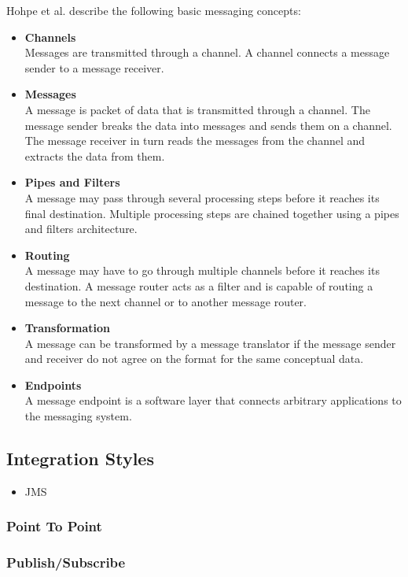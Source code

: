 Hohpe et al.\cite{Hohpe:2003fk} describe the following basic messaging concepts:
\begin{itemize}
	\item \textbf{Channels}\\
	Messages are transmitted through a channel. A channel connects a message sender to a message receiver.
	\item \textbf{Messages}\\
	A message is packet of data that is transmitted through a channel. The message sender breaks the data into messages and sends them on a channel. The message receiver in turn reads the messages from the channel and extracts the data from them.
	\item \textbf{Pipes and Filters}\\
	A message may pass through several processing steps before it reaches its final destination. Multiple processing steps are chained together using a pipes and filters architecture.
	\item \textbf{Routing}\\
	A message may have to go through multiple channels before it reaches its destination. A message router acts as a filter and is capable of routing a message to the next channel or to another message router.
	\item \textbf{Transformation}\\
	A message can be transformed by a message translator if the message sender and receiver do not agree on the format for the same conceptual data.
	\item \textbf{Endpoints}\\
	A message endpoint is a software layer that connects arbitrary applications to the messaging system.
\end{itemize}

\subsection{Integration Styles}

\begin{itemize}
	\item JMS
\end{itemize}

\subsubsection{Point To Point}

\subsubsection{Publish/Subscribe}

